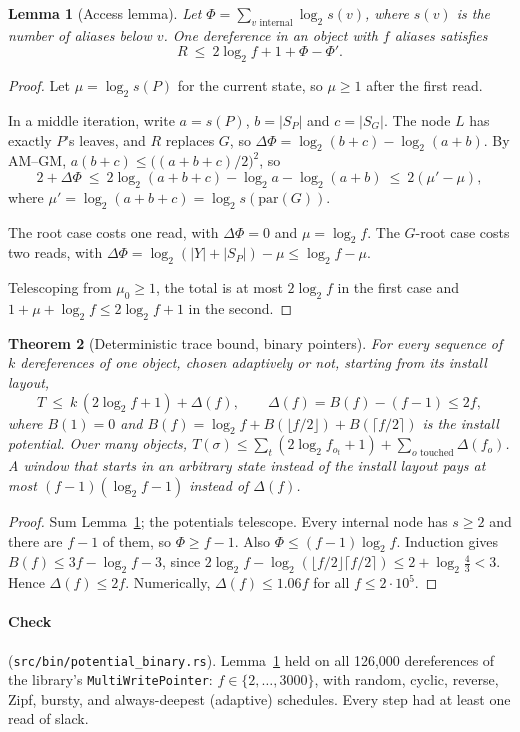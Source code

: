 \documentclass[11pt]{article}
\newtheorem{theorem}{Theorem}
\newtheorem{lemma}[theorem]{Lemma}
\theoremstyle{definition}
\begin{document}
\begin{lemma}[Access lemma]\label{lem:access}
Let $\Phi=\sum_{v\text{ internal}}\log_2 s(v)$, where $s(v)$ is the number of
aliases below $v$. One dereference in an object with $f$ aliases satisfies
\[ R\ \le\ 2\log_2 f+1+\Phi-\Phi'. \]
\end{lemma}
\begin{proof}
Let $\mu=\log_2 s(P)$ for the current state, so $\mu\ge 1$ after the first
read.

In a middle iteration, write $a=s(P)$, $b=|S_P|$ and $c=|S_G|$. The node $L$
has exactly $P$'s leaves, and $R$ replaces $G$, so
$\Delta\Phi=\log_2(b+c)-\log_2(a+b)$. By AM--GM,
$a(b+c)\le\bigl((a+b+c)/2\bigr)^2$, so
\[
2+\Delta\Phi\ \le\ 2\log_2(a+b+c)-\log_2 a-\log_2(a+b)\ \le\ 2(\mu'-\mu),
\]
where $\mu'=\log_2(a+b+c)=\log_2 s(\mathrm{par}(G))$.

The root case costs one read, with $\Delta\Phi=0$ and $\mu=\log_2 f$. The
$G$-root case costs two reads, with
$\Delta\Phi=\log_2(|Y|+|S_P|)-\mu\le\log_2 f-\mu$.

Telescoping from $\mu_0\ge 1$, the total is at most $2\log_2 f$ in the first
case and $1+\mu+\log_2 f\le 2\log_2 f+1$ in the second.
\end{proof}

\begin{theorem}[Deterministic trace bound, binary pointers]\label{thm:binary}
For every sequence of $k$ dereferences of one object, chosen adaptively or
not, starting from its install layout,
\[
T\ \le\ k\,(2\log_2 f+1)+\Delta(f),\qquad \Delta(f)=B(f)-(f-1)\le 2f,
\]
where $B(1)=0$ and $B(f)=\log_2 f+B(\lfloor f/2\rfloor)+B(\lceil f/2\rceil)$
is the install potential. Over many objects,
$T(\sigma)\le\sum_t(2\log_2 f_{o_t}+1)+\sum_{o\text{ touched}}\Delta(f_o)$. A
window that starts in an arbitrary state instead of the install layout pays at
most $(f-1)(\log_2 f-1)$ instead of $\Delta(f)$.
\end{theorem}
\begin{proof}
Sum Lemma~\ref{lem:access}; the potentials telescope. Every internal node has
$s\ge 2$ and there are $f-1$ of them, so $\Phi\ge f-1$. Also
$\Phi\le(f-1)\log_2 f$. Induction gives $B(f)\le 3f-\log_2 f-3$, since
$2\log_2 f-\log_2(\lfloor f/2\rfloor\lceil f/2\rceil)\le 2+\log_2\tfrac43<3$.
Hence $\Delta(f)\le 2f$. Numerically, $\Delta(f)\le 1.06f$ for all
$f\le 2\cdot10^5$.
\end{proof}

\paragraph{Check} (\texttt{src/bin/potential\_binary.rs}). Lemma~\ref{lem:access}
held on all 126{,}000 dereferences of the library's
\texttt{MultiWritePointer}: $f\in\{2,\dots,3000\}$, with random, cyclic,
reverse, Zipf, bursty, and always-deepest (adaptive) schedules. Every step had
at least one read of slack.
\end{document}
